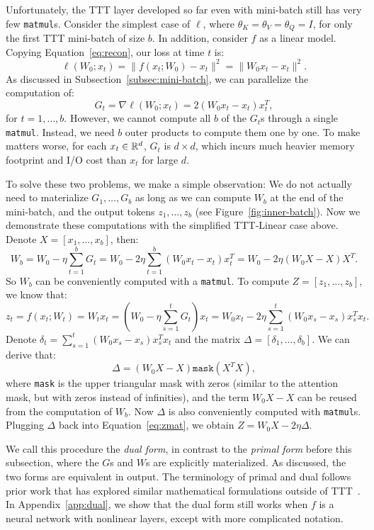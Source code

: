 \documentclass{article}
\begin{document}
Unfortunately, the TTT layer developed so far even with mini-batch still has very few \texttt{matmul}s.
Consider the simplest case of $\ell$, where $\theta_K = \theta_V = \theta_Q = I$, for only the first TTT mini-batch of size $b$.
In addition, consider $f$ as a linear model.
Copying Equation~\ref{eq:recon},
our loss at time $t$ is:
$$
\ell\left( W_0; x_t \right) = \|f(x_t; W_0) - x_t\|^2 
= \|W_0 x_t - x_t\|^2.
$$
As discussed in Subsection~\ref{subsec:mini-batch}, we can parallelize the computation of:
$$
G_t = \nabla \ell\left( W_0; x_t \right) = 2(W_0 x_t - x_t)x_t^T,
$$
for $t=1,\dots,b$.
However, we cannot compute all $b$ of the $G_t$s through a single \texttt{matmul}.
Instead, we need $b$ outer products to compute them one by one.
To make matters worse, for each $x_t\in \mathbb{R}^d$, $G_t$ is $d\times d$, which incurs much heavier memory footprint and I/O cost than $x_t$ for large $d$.

To solve these two problems, we make a simple observation: We do not actually need to materialize $G_1, \dots, G_b$ as long as we can compute $W_b$ at the end of the mini-batch, and the output tokens $z_1, \dots, z_b$ (see Figure~\ref{fig:inner-batch}).
Now we demonstrate these computations with the simplified TTT-Linear case above.
Denote $X = [x_1, \dots, x_b]$, then:
$$
W_b = W_0 - \eta\sum_{t=1}^b G_t
= W_0 - 2\eta\sum_{t=1}^b (W_0 x_t - x_t)x_t^T
= W_0 - 2\eta(W_0X - X)X^T.
$$
So $W_b$ can be conveniently computed with a \texttt{matmul}.
To compute $Z = [z_1, \dots, z_b]$, we know that:
\begin{equation}
\label{eq:zmat}
z_t = f(x_t; W_t) = W_tx_t = \left(W_0 - \eta \sum_{s=1}^t G_t\right)x_t
= W_0x_t - 2\eta \sum_{s=1}^t (W_0x_s - x_s)x_s^Tx_t.
\end{equation}
Denote $\delta_t = \sum_{s=1}^t (W_0x_s - x_s)x_s^Tx_t$ and the matrix $\Delta = [\delta_1, \dots, \delta_b]$.
We can derive that:
\begin{equation}
\Delta = \left( W_0X - X \right)\texttt{mask}\left( X^TX \right),
\end{equation}
where \texttt{mask} is the upper triangular mask with zeros (similar to the attention mask, but with zeros instead of infinities), and the term $W_0X - X$ can be reused from the computation of $W_b$.
Now $\Delta$ is also conveniently computed with \texttt{matmul}s. 
Plugging $\Delta$ back into Equation~\ref{eq:zmat}, we obtain $Z = W_0X - 2\eta\Delta$.

We call this procedure the \emph{dual form}, in contrast to the \emph{primal form} before this subsection, where the $G$s and $W$s are explicitly materialized.
As discussed, the two forms are equivalent in output. 
The terminology of primal and dual follows prior work that has explored similar mathematical formulations outside of TTT~\cite{irie2022dual, bishop2006pattern, rosenblatt1958perceptron}.
In Appendix~\ref{app:dual}, we show that the dual form still works when $f$ is a neural network with nonlinear layers, except with more complicated notation.
\end{document}
